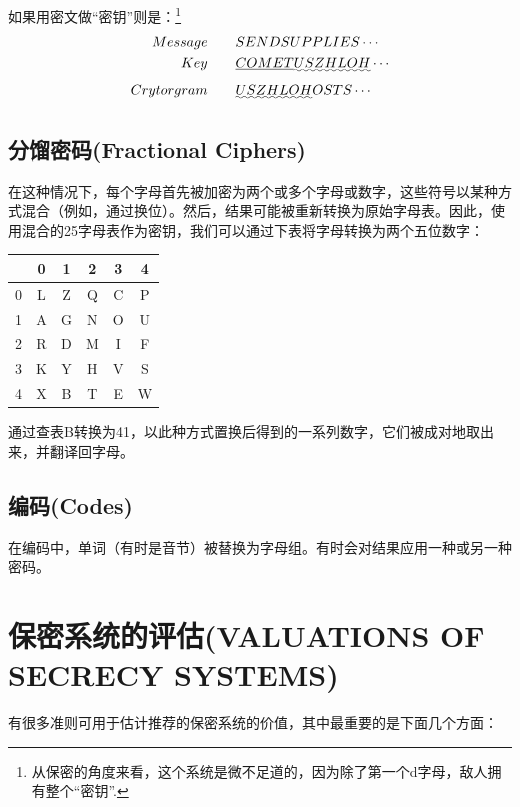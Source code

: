 \documentclass[]{article}
\begin{document}
如果用密文做“密钥”则是：\footnote{从保密的角度来看，这个系统是微不足道的，因为除了第一个d字母，敌人拥有整个“密钥”.}
\begin{equation}
	\begin{aligned}
		Message\qquad    &SENDSUPPLIES\cdots \\
		Key\qquad        &\underline{COMET}\uwave{USZHLOH}\cdots \\
		Crytorgram\qquad &\uwave{USZHLOH}OSTS\cdots \nonumber
		\end{aligned}
\end{equation}

\subsection{分馏密码(Fractional Ciphers)}

在这种情况下，每个字母首先被加密为两个或多个字母或数字，这些符号以某种方式混合（例如，通过换位）。然后，结果可能被重新转换为原始字母表。因此，使用混合的25字母表作为密钥，我们可以通过下表将字母转换为两个五位数字：
\begin{center}
	\begin{tabular}{c|c|c|c|c|c}
		
		& 0 & 1 & 2 & 3 & 4 \\ 
		\hline 
		0&L  & Z & Q & C & P \\ 
		\hline 
		1&A  & G & N & O & U \\ 
		\hline 
		2& R & D &M  & I & F \\ 
		\hline 
		3& K & Y & H & V & S \\ 
		\hline 
		4& X & B & T & E & W \\ 
		
	\end{tabular} 
\end{center}


通过查表B转换为41，以此种方式置换后得到的一系列数字，它们被成对地取出来，并翻译回字母。

\subsection{编码(Codes)}
在编码中，单词（有时是音节）被替换为字母组。有时会对结果应用一种或另一种密码。

\section{保密系统的评估(VALUATIONS OF SECRECY SYSTEMS)}

有很多准则可用于估计推荐的保密系统的价值，其中最重要的是下面几个方面：
\end{document}
